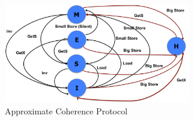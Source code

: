 \begin{figure}[h]
  \centering
  \includegraphics[height=2.5 in, width=3.2in]{figures/figure5.pdf}
  \caption{Approximate Coherence Protocol}
  \label{fig:profile}
\end{figure}
